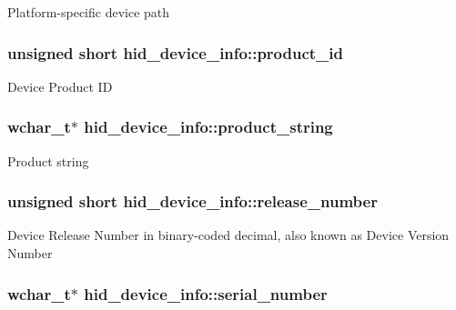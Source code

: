 \-Platform-\/specific device path \hypertarget{structhid__device__info_a04595915457b4374492edb1fdb62d65d}{
\subsubsection[{product\-\_\-id}]{\setlength{\rightskip}{0pt plus 5cm}unsigned short {\bf hid\-\_\-device\-\_\-info\-::product\-\_\-id}}}\label{structhid__device__info_a04595915457b4374492edb1fdb62d65d}
\-Device \-Product \-I\-D \hypertarget{structhid__device__info_aceee256b4f7cd7fdd9fa5d556f49d221}{
\subsubsection[{product\-\_\-string}]{\setlength{\rightskip}{0pt plus 5cm}wchar\-\_\-t$\ast$ {\bf hid\-\_\-device\-\_\-info\-::product\-\_\-string}}}\label{structhid__device__info_aceee256b4f7cd7fdd9fa5d556f49d221}
\-Product string \hypertarget{structhid__device__info_a6a832d25260f7ec17ef008e53e50e1d0}{
\subsubsection[{release\-\_\-number}]{\setlength{\rightskip}{0pt plus 5cm}unsigned short {\bf hid\-\_\-device\-\_\-info\-::release\-\_\-number}}}\label{structhid__device__info_a6a832d25260f7ec17ef008e53e50e1d0}
\-Device \-Release \-Number in binary-\/coded decimal, also known as \-Device \-Version \-Number \hypertarget{structhid__device__info_a80756cea367e1566f966438984b75faf}{
\subsubsection[{serial\-\_\-number}]{\setlength{\rightskip}{0pt plus 5cm}wchar\-\_\-t$\ast$ {\bf hid\-\_\-device\-\_\-info\-::serial\-\_\-number}}}\label{structhid__device__info_a80756cea367e1566f966438984b75faf}
